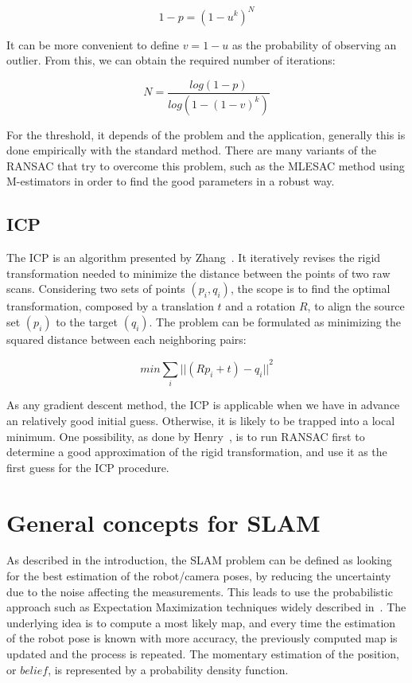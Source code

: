 \[
1-p = (1-u^k)^N
\]

It can be more convenient to define $v=1-u$ as the probability of observing an outlier. From this, we can obtain the required number of iterations:

\[
N = \frac{log(1-p)}{log(1-(1-v)^k)}
\]

For the threshold, it depends of the problem and the application, generally this is done empirically with the standard method. There are many variants of the \gls{RANSAC} that try to overcome this problem, such as the MLESAC method \cite{TorrZ00} using M-estimators in order to find the good parameters in a robust way.


\subsection{ICP}

The \gls{ICP} is an algorithm presented by Zhang~\cite{zhang_92_icp}.
It iteratively revises the rigid transformation needed to minimize the distance between the points of two raw scans. Considering two sets of points $(p_{i}, q_{i})$, the scope is to find the optimal transformation, composed by a translation $t$ and a rotation $R$, to align the source set $(p_{i})$ to the target $(q_{i})$. The problem can be formulated as minimizing the squared distance between each neighboring pairs:

\[min \sum_{i}{||(Rp_{i}+t)-q_{i}||}^2\]

As any gradient descent method, the \gls{ICP} is applicable when we have in advance an relatively good initial guess. Otherwise, it is likely to be trapped into a local minimum. One possibility, as done by Henry~\cite{Henry_RGBD_2010}, is to run \gls{RANSAC} first to determine a good approximation of the rigid transformation, and use it as the first guess for the \gls{ICP} procedure.

\clearpage
\section{General concepts for SLAM}

As described in the introduction, the \gls{SLAM} problem can be defined as looking for the best estimation of the robot/camera poses, by reducing the uncertainty due to the noise affecting the measurements. This leads to use the probabilistic approach such as Expectation Maximization techniques widely described in~\cite{Thrun_2005}. The underlying idea is to compute a most likely map, and every time the estimation of the robot pose is known with more accuracy, the previously computed map is updated and the process is repeated. The momentary estimation of the position, or $belief$, is represented by a probability density function. 


